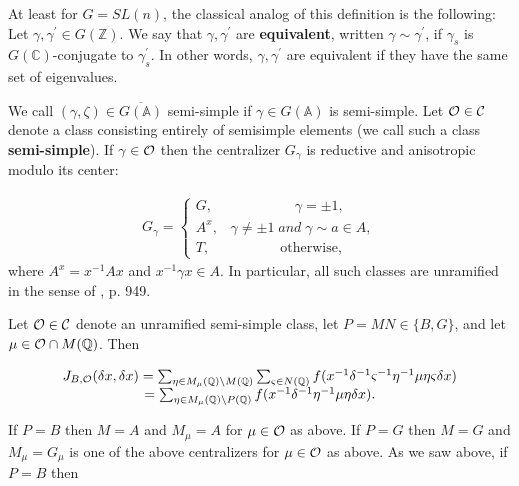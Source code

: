 At least for $G=SL(n)$, the classical analog of this definition is the
following: Let $\gamma ,\gamma ^{\prime }\in G({\mathbb{Z}})$. We say that
$\gamma ,\gamma ^{\prime }$ are \textbf{equivalent}, written $\gamma \sim
\gamma ^{\prime }$, if $\gamma _s$ is $G(\mathbb{C})$-conjugate to $\gamma
_s^{\prime } $. In other words, $\gamma ,\gamma ^{\prime }$ are equivalent
if they have the same set of eigenvalues.

We call $(\gamma ,\zeta)\in \overline{G({\mathbb{A}})}$
semi-simple if $\gamma\in G({\mathbb{A}})$ is semi-simple.
Let ${\cal{O}}\in \mathcal{C}$ denote a
class consisting entirely of semisimple
elements (we call such a class \textbf{semi-simple}).
If $\gamma \in {\cal{O}}$
then the centralizer $G_\gamma $ is reductive and anisotropic modulo its
center:

\begin{equation}
\begin{array}{c}
G_\gamma =\left\{ 
\begin{array}{c}
G,\;\;\;\;\;\;\;\;\;\;\;\;\;\;\;\;\;\;\;\;\;\gamma =\pm 1, \\ 
A^x,\;\;\;\gamma \neq \pm 1\;and\;\gamma \sim a\in A, \\ 
T,\;\;\;\;\;\;\;\;\;\;\;\;\;\;\;\;\;\;\mathrm{otherwise},
\end{array}
\right.
\end{array}
\end{equation}
where $A^x=x^{-1}Ax$ and $x^{-1}\gamma x\in A$.
In particular, all such classes are unramified in the sense of
\cite{A2}, p. 949.

Let ${\cal{O}}\in \mathcal{C}$ denote an unramified
semi-simple class, let $P=MN\in\{B,G\}$, and let
$\mu \in {\cal{O}}\cap M({\mathbb{Q}})$.
Then

\begin{equation}
\begin{array}{c}
J_{B,{\cal{O}}}(\delta x,\delta x)
=\sum_{\eta \in M_\mu ( {\mathbb{Q}})\backslash M(\mathbb{Q})}
\sum_{\varsigma \in N({\mathbb{Q}})}
f(x^{-1}\delta ^{-1}\varsigma ^{-1}\eta^{-1}\mu \eta \varsigma \delta x) \\ 
=\sum_{\eta \in M_\mu ({\mathbb{Q}})\backslash P({\mathbb{Q}})}
f(x^{-1}\delta^{-1}\eta ^{-1}\mu \eta \delta x).
\end{array}
\end{equation}

If $P=B$ then $M=A$ and $M_\mu =A$ for
$\mu \in {\cal{O}}$ as above. If $P=G$ then
$M=G$ and $M_\mu =G_\mu $ is one of the above
centralizers for $\mu \in {\cal{O}}$ as
above. As we saw above, if $P=B$ then


